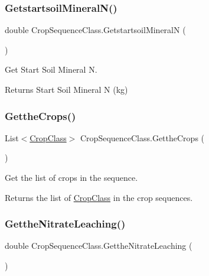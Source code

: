 \subsubsection{\texorpdfstring{GetstartsoilMineralN()}{GetstartsoilMineralN()}}
{\footnotesize\ttfamily double Crop\+Sequence\+Class.\+Getstartsoil\+MineralN (\begin{DoxyParamCaption}{ }\end{DoxyParamCaption})\hspace{0.3cm}{\ttfamily [inline]}}



Get Start Soil Mineral N. 

\begin{DoxyReturn}{Returns}
Start Soil Mineral N (kg) 
\end{DoxyReturn}
\mbox{\label{class_crop_sequence_class_a63762c38c16e0b0ebbf680ad1cf841d3}} 
\subsubsection{\texorpdfstring{GettheCrops()}{GettheCrops()}}
{\footnotesize\ttfamily List$<$\mbox{\hyperlink{class_crop_class}{Crop\+Class}}$>$ Crop\+Sequence\+Class.\+Getthe\+Crops (\begin{DoxyParamCaption}{ }\end{DoxyParamCaption})\hspace{0.3cm}{\ttfamily [inline]}}



Get the list of crops in the sequence. 

\begin{DoxyReturn}{Returns}
the list of \mbox{\hyperlink{class_crop_class}{Crop\+Class}} in the crop sequences. 
\end{DoxyReturn}
\mbox{\label{class_crop_sequence_class_a77ccfdb367dfd6a8ae9b92ae9ca9eed8}} 
\subsubsection{\texorpdfstring{GettheNitrateLeaching()}{GettheNitrateLeaching()}\hspace{0.1cm}{\footnotesize\ttfamily [1/2]}}
{\footnotesize\ttfamily double Crop\+Sequence\+Class.\+Getthe\+Nitrate\+Leaching (\begin{DoxyParamCaption}{ }\end{DoxyParamCaption})\hspace{0.3cm}{\ttfamily [inline]}}




